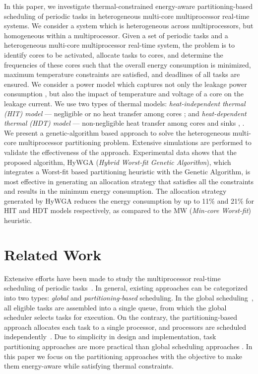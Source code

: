 \documentclass[conference]{IEEEtran}
\begin{document}
In this paper, we investigate thermal-constrained energy-aware partitioning-based scheduling of periodic tasks in heterogeneous multi-core multiprocessor real-time systems.
We consider a system which is heterogeneous across multiprocessors, but homogeneous within a multiprocessor.
Given a set of periodic tasks and a heterogeneous multi-core multiprocessor real-time system, the problem is to identify cores to be activated, allocate tasks to cores, and determine the frequencies of these cores such that the overall energy consumption is minimized, maximum temperature constraints are satisfied, and deadlines of all tasks are ensured.
We consider a power model which captures not only the leakage power consumption \cite{Langen09}, but also the impact of  temperature \cite{Fisher09} and voltage \cite{Quan10} of a core on the leakage current.
We use two types of thermal models: \emph{heat-independent thermal (HIT) model}  --- negligible or no heat transfer
among cores \cite{Quan10}; and
\emph{heat-dependent thermal (HDT) model} --- non-negligible heat transfer among cores and sinks \cite{Chantem10}, \cite{Fisher09}.
We present a genetic-algorithm based approach to solve the heterogeneous multi-core multiprocessor partitioning problem.
Extensive simulations are performed to validate the effectiveness of the approach. Experimental data shows that the proposed algorithm,
HyWGA (\emph{Hybrid Worst-fit Genetic Algorithm}),
which integrates a Worst-fit based partitioning heuristic with the Genetic Algorithm, %
is most effective in generating an allocation strategy that satisfies all the constraints and results in the minimum energy consumption.
The allocation strategy generated by HyWGA reduces the energy
consumption by up to 11\% and 21\% for HIT and HDT models respectively, as compared to the MW (\emph{Min-core Worst-fit}) heuristic.


\section{Related Work}

Extensive efforts have been made to study the multiprocessor real-time scheduling of periodic tasks~\cite{Carpenter04}.
In general, existing approaches can be categorized into two types: \emph{global} and \emph{partitioning-based} scheduling.
In the global scheduling~\cite{Baruah94}, all eligible tasks are assembled into a single queue,
from which the global scheduler selects tasks for execution.
On the contrary, the partitioning-based
approach allocates each task to a single processor, %
and %
processors are scheduled independently~\cite{Baruah04}.
Due to simplicity in design and implementation, task partitioning approaches are more practical than global scheduling approaches \cite{Goraczko08}.
In this paper we focus on the partitioning approaches with the objective to make them energy-aware while satisfying thermal constraints.
\end{document}
